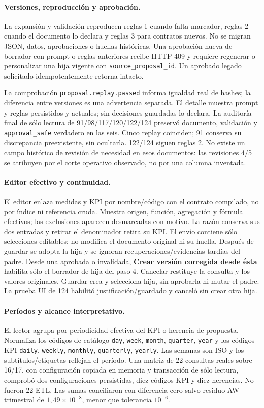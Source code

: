 \documentclass[11pt,letterpaper]{article}
\newcommand{\file}[1]{\texttt{#1}}
\begin{document}
\paragraph{Versiones, reproducción y aprobación.}
La expansión y validación reproducen reglas 1 cuando falta marcador, reglas 2
cuando el documento lo declara y reglas 3 para contratos nuevos. No se migran
JSON, datos, aprobaciones o huellas históricas. Una aprobación nueva de borrador
con prompt o reglas anteriores recibe HTTP 409 y requiere regenerar o personalizar
una hija vigente con \file{source\_proposal\_id}. Un aprobado legado solicitado
idempotentemente retorna intacto.

La comprobación \file{proposal.replay.passed} informa igualdad real de hashes;
la diferencia entre versiones es una advertencia separada. El detalle muestra
prompt y reglas persistidos y actuales; sin decisiones guardadas lo declara.
La auditoría final de sólo lectura de 91/98/117/120/122/124 preservó documento,
validación y \file{approval\_safe} verdadero en las seis. Cinco replay coinciden;
91 conserva su discrepancia preexistente, sin ocultarla. 122/124 siguen reglas 2.
No existe un campo histórico de revisión de necesidad en esos documentos: las
revisiones 4/5 se atribuyen por el corte operativo observado, no por una columna inventada.

\paragraph{Editor efectivo y continuidad.}
El editor enlaza medidas y KPI por nombre/código con el contrato compilado, no
por índice ni referencia cruda. Muestra origen, función, agregación y fórmula
efectivos; las exclusiones aparecen desmarcadas con motivo. La razón conserva
sus dos entradas y retirar el denominador retira su KPI. El envío contiene sólo
selecciones editables; no modifica el documento original ni su huella.
Después de guardar se adopta la hija y se ignoran recuperaciones/evidencias tardías
del padre. Desde una aprobada o invalidada, \textbf{Crear versión corregida desde ésta}
habilita sólo el borrador de hija del paso 4. Cancelar restituye la consulta y los
valores originales. Guardar crea y selecciona hija, sin aprobarla ni mutar el padre.
La prueba UI de 124 habilitó justificación/guardado y canceló sin crear otra hija.

\paragraph{Períodos y alcance interpretativo.}
El lector agrupa por periodicidad efectiva del KPI o herencia de propuesta.
Normaliza los códigos de catálogo \file{day}, \file{week}, \file{month},
\file{quarter}, \file{year} y los códigos KPI \file{daily}, \file{weekly},
\file{monthly}, \file{quarterly}, \file{yearly}. Las semanas son ISO y los
subtítulos/etiquetas reflejan el período. Una matriz de 22 consultas reales sobre
16/17, con configuración copiada en memoria y transacción de sólo lectura,
comprobó dos configuraciones persistidas, diez códigos KPI y diez herencias.
No fueron 22 ETL. Las sumas conciliaron con diferencia cero salvo residuo AW
trimestral de \(1{,}49\times10^{-8}\), menor que tolerancia \(10^{-6}\).
\end{document}
